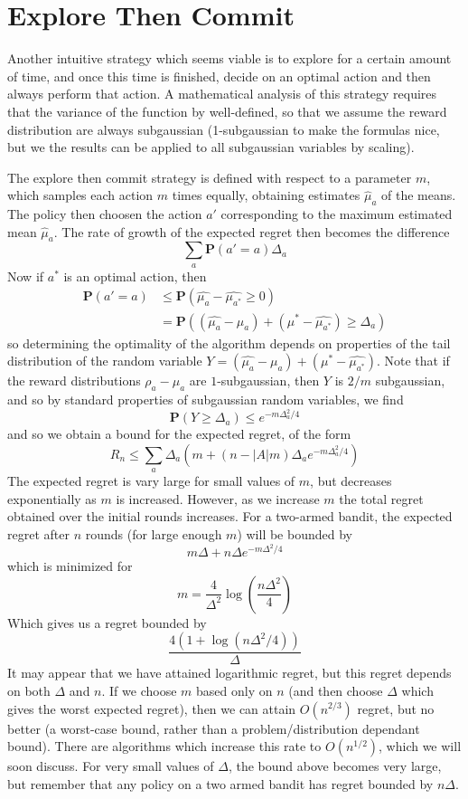 \section{Explore Then Commit}

Another intuitive strategy which seems viable is to explore for a certain amount of time, and once this time is finished, decide on an optimal action and then always perform that action. A mathematical analysis of this strategy requires that the variance of the function by well-defined, so that we assume the reward distribution are always subgaussian (1-subgaussian to make the formulas nice, but we the results can be applied to all subgaussian variables by scaling).

The explore then commit strategy is defined with respect to a parameter $m$, which samples each action $m$ times equally, obtaining estimates $\widehat{\mu}_a$ of the means. The policy then choosen the action $a'$ corresponding to the maximum estimated mean $\widehat{\mu}_a$. The rate of growth of the expected regret then becomes the difference
%
\[ \sum_a \mathbf{P}(a' = a) \Delta_a \]
%
Now if $a^*$ is an optimal action, then
%
\begin{align*}
    \mathbf{P}(a' = a) &\leq \mathbf{P}(\widehat{\mu_a} - \widehat{\mu_{a^*}} \geq 0)\\
    &= \mathbf{P}((\widehat{\mu_a} - \mu_a) + (\mu^* - \widehat{\mu_{a^*}}) \geq \Delta_a)
\end{align*}
%
so determining the optimality of the algorithm depends on properties of the tail distribution of the random variable $Y = (\widehat{\mu_a} - \mu_a) + (\mu^* - \widehat{\mu_{a^*}})$. Note that if the reward distributions $\rho_a - \mu_a$ are $1$-subgaussian, then $Y$ is $2/m$ subgaussian, and so by standard properties of subgaussian random variables, we find
%
\[ \mathbf{P}(Y \geq \Delta_a) \leq e^{-m\Delta_a^2/4} \]
%
and so we obtain a bound for the expected regret, of the form
%
\[ R_n \leq \sum_a \Delta_a (m + (n - |A|m) \Delta_a e^{-m\Delta_a^2/4}) \]
%
The expected regret is vary large for small values of $m$, but decreases exponentially as $m$ is increased. However, as we increase $m$ the total regret obtained over the initial rounds increases. For a two-armed bandit, the expected regret after $n$ rounds (for large enough $m$) will be bounded by
%
\[ m \Delta + n \Delta e^{-m \Delta^2/4} \]
%
which is minimized for
%
\[ m = \frac{4}{\Delta^2} \log \left(\frac{n \Delta^2}{4} \right) \]
%
Which gives us a regret bounded by
%
\[ \frac{4 (1 + \log(n\Delta^2/4))}{\Delta} \]
%
It may appear that we have attained logarithmic regret, but this regret depends on both $\Delta$ and $n$. If we choose $m$ based only on $n$ (and then choose $\Delta$ which gives the worst expected regret), then we can attain $O(n^{2/3})$ regret, but no better (a worst-case bound, rather than a problem/distribution dependant bound). There are algorithms which increase this rate to $O(n^{1/2})$, which we will soon discuss. For very small values of $\Delta$, the bound above becomes very large, but remember that any policy on a two armed bandit has regret bounded by $n \Delta$.

